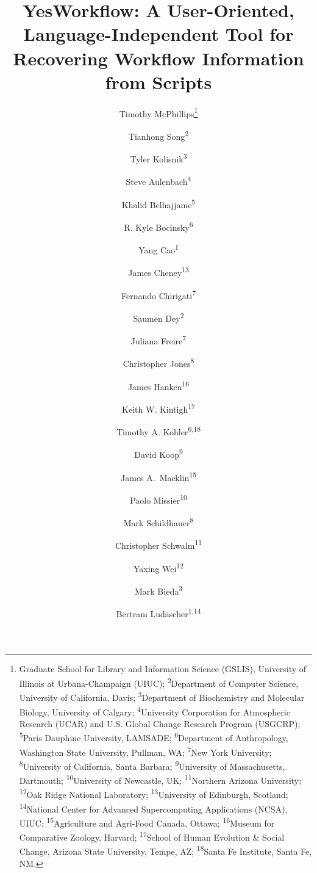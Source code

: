 \documentclass{article}
\newcommand{\YWT}{\textsf{YesWorkflow}}
\begin{document}
\title{\bf \YWT: A User-Oriented, Language-Independent Tool for
  Recovering Workflow Information from Scripts
}


\author{Timothy McPhillips\thanks{Graduate School for Library and
Information Science (GSLIS), University of Illinois at Urbana-Champaign (UIUC);
\textsuperscript{2}Department of Computer Science, University of California, Davis;
\textsuperscript{3}Department of Biochemistry and Molecular Biology, University of Calgary;
\textsuperscript{4}University Corporation for Atmospheric Research (UCAR) and U.S.
Global Change Research Program (USGCRP);
\textsuperscript{5}Paris Dauphine University, LAMSADE;
\textsuperscript{6}Department of Anthropology, Washington State University, Pullman, WA; 
\textsuperscript{7}New York University;
\textsuperscript{8}University of California, Santa Barbara;
\textsuperscript{9}University of Massachusetts, Dartmouth;
\textsuperscript{10}University of Newcastle, UK;
\textsuperscript{11}Northern Arizona University;
\textsuperscript{12}Oak Ridge National Laboratory;
\textsuperscript{13}University of Edinburgh, Scotland;
\textsuperscript{14}National Center for Advanced Supercomputing Applications (NCSA), UIUC;
\textsuperscript{15}Agriculture and Agri-Food Canada, Ottawa;
\textsuperscript{16}Museum for Comparative Zoology, Harvard;
\textsuperscript{17}School of Human Evolution \& Social Change, Arizona State University, Tempe, AZ;
\textsuperscript{18}Santa Fe Institute, Santa Fe, NM.}
 \and
Tianhong Song\textsuperscript{2} \and
Tyler Kolisnik\textsuperscript{3} \and
Steve Aulenbach\textsuperscript{4} \and
Khalid Belhajjame\textsuperscript{5} \and
R. Kyle Bocinsky\textsuperscript{6} \and
Yang Cao\textsuperscript{1} \and
James Cheney\textsuperscript{13} \and
Fernando Chirigati\textsuperscript{7} \and
Saumen Dey\textsuperscript{2} \and
Juliana Freire\textsuperscript{7} \and
Christopher Jones\textsuperscript{8} \and
James Hanken\textsuperscript{16} \and
Keith W. Kintigh\textsuperscript{17} \and
Timothy A. Kohler\textsuperscript{6,18} \and
David Koop\textsuperscript{9} \and
James A.\ Macklin\textsuperscript{15} \and
Paolo Missier\textsuperscript{10} \and
Mark Schildhauer\textsuperscript{8} \and
Christopher Schwalm\textsuperscript{11} \and
Yaxing Wei\textsuperscript{12} \and
Mark Bieda\textsuperscript{3} \and
Bertram Lud\"ascher\textsuperscript{1,14}}
\end{document}
